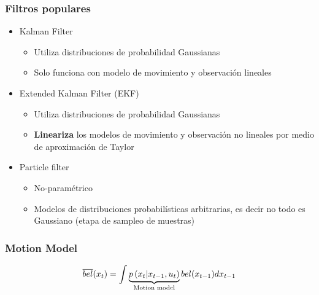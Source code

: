 \begin{frame}
  \frametitle{Filtros populares}
    \begin{itemize}
        \item Kalman Filter
        \begin{itemize}
            \item Utiliza distribuciones de probabilidad Gaussianas
            \item Solo funciona con modelo de movimiento y observación lineales
        \end{itemize}
        \item Extended Kalman Filter (EKF)
        \begin{itemize}
            \item Utiliza distribuciones de probabilidad Gaussianas
            \item {\bf Lineariza} los modelos de movimiento y observación no lineales por medio de aproximación de Taylor
        \end{itemize}
        \item Particle filter
        \begin{itemize}
            \item No-paramétrico 
            \item Modelos de distribuciones probabilísticas arbitrarias, es decir no todo es Gaussiano (etapa de sampleo de muestras)
        \end{itemize}
    \end{itemize}

\end{frame}

\begin{frame}
  \frametitle{Motion Model}
    \begin{equation*}
        \overline{bel}(x_{t}) = \int \underbrace{p\left(x_{t} | x_{t-1}, u_{t} \right)}_{\text{Motion model}} bel(x_{t-1}) d x_{t-1}
    \end{equation*}
\end{frame}

